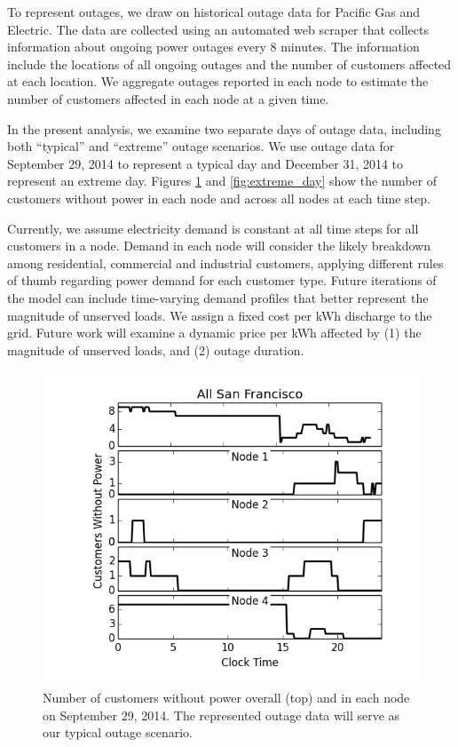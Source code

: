 \documentclass[journal]{IEEEtran}
\begin{document}
To represent outages, we draw on historical outage data for Pacific Gas and Electric. The data are collected using an automated web scraper that collects information about ongoing power outages every 8 minutes. The information include the locations of all ongoing outages and the number of customers affected at each location. We aggregate outages reported in each node to estimate the number of customers affected in each node at a given time.

In the present analysis, we examine two separate days of outage data, including both ``typical'' and ``extreme'' outage scenarios. We use outage data for September 29, 2014 to represent a typical day and December 31, 2014 to represent an extreme day. Figures \ref{fig:typical_day} and \ref{fig:extreme_day} show the number of customers without power in each node and across all nodes at each time step.

Currently, we assume electricity demand is constant at all time steps for all customers in a node. Demand in each node will consider the likely breakdown among residential, commercial and industrial customers, applying different rules of thumb regarding power demand for each customer type. Future iterations of the model can include time-varying demand profiles that better represent the magnitude of unserved loads. We assign a fixed cost per kWh discharge to the grid. Future work will examine a dynamic price per kWh affected by (1) the magnitude of unserved loads, and (2) outage duration.

\begin{figure}
  \label{fig:typical_day}
  \caption{Number of customers without power overall (top) and in each node on September 29, 2014. The represented outage data will serve as our typical outage scenario.}
  \includegraphics[width=\linewidth]{plots/typical_day_2014929.png}
\end{figure}
\end{document}
